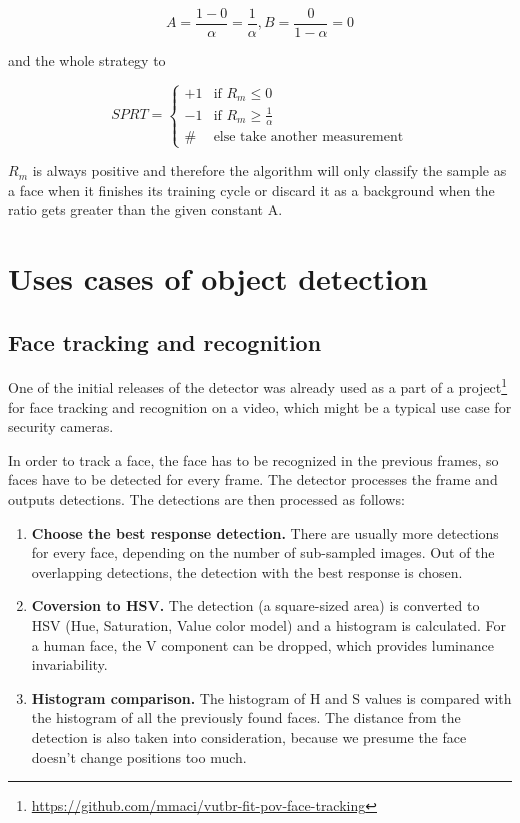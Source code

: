 \begin{equation}
A=\frac{1-0}{\alpha}=\frac{1}{\alpha}, B=\frac{0}{1-\alpha}=0
\end{equation}

and the whole strategy to

\[
 SPRT =
  \begin{cases}
   +1 & \text{if } R_{m} \leq 0 \\
   -1 & \text{if } R_{m} \geq \frac{1}{\alpha} \\
   \# & \text{else take another measurement} 
  \end{cases}
\]

$R_{m}$ is always positive and therefore the algorithm will only classify the sample as a face when it finishes its training cycle or discard it as a background when the ratio gets greater than the given constant A.

\section{Uses cases of object detection}

\subsection{Face tracking and recognition}\label{subsec:face-tracking}

One of the initial releases of the detector was already used as a part of a project\footnote{\url{https://github.com/mmaci/vutbr-fit-pov-face-tracking}} for face tracking and recognition on a video, which might be a typical use case for security cameras.

In order to track a face, the face has to be recognized in the previous frames, so faces have to be detected for every frame. The detector processes the frame and outputs detections. The detections are then processed as follows:

\begin{enumerate}
	\item \textbf{Choose the best response detection.} There are usually more detections for every face, depending on the number of sub-sampled images. Out of the overlapping detections, the detection with the best response is chosen.
	\item \textbf{Coversion to HSV.} The detection (a square-sized area) is converted to HSV (Hue, Saturation, Value color model) and a histogram is calculated. For a human face, the V component can be dropped, which provides luminance invariability.
	\item \textbf{Histogram comparison.} The histogram of H and S values is compared with the histogram of all the previously found faces. The distance from the detection is also taken into consideration, because we presume the face doesn't change positions too much.
\end{enumerate}

